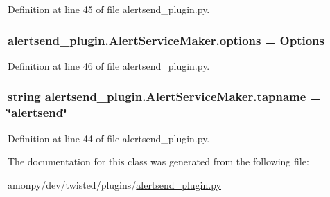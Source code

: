 Definition at line 45 of file alertsend\-\_\-plugin.\-py.

\hypertarget{classalertsend__plugin_1_1_alert_service_maker_a3ca254bf6fd586ded22ae26866a8dbb9}{
\subsubsection[{options}]{\setlength{\rightskip}{0pt plus 5cm}alertsend\-\_\-plugin.\-Alert\-Service\-Maker.\-options = {\bf Options}\hspace{0.3cm}{\ttfamily [static]}}}\label{classalertsend__plugin_1_1_alert_service_maker_a3ca254bf6fd586ded22ae26866a8dbb9}


Definition at line 46 of file alertsend\-\_\-plugin.\-py.

\hypertarget{classalertsend__plugin_1_1_alert_service_maker_abf35c4fc0c983dfca5201f25cb643a1a}{
\subsubsection[{tapname}]{\setlength{\rightskip}{0pt plus 5cm}string alertsend\-\_\-plugin.\-Alert\-Service\-Maker.\-tapname = \char`\"{}alertsend\char`\"{}\hspace{0.3cm}{\ttfamily [static]}}}\label{classalertsend__plugin_1_1_alert_service_maker_abf35c4fc0c983dfca5201f25cb643a1a}


Definition at line 44 of file alertsend\-\_\-plugin.\-py.



The documentation for this class was generated from the following file\-:\begin{DoxyCompactItemize}
\item 
amonpy/dev/twisted/plugins/\hyperlink{alertsend__plugin_8py}{alertsend\-\_\-plugin.\-py}\end{DoxyCompactItemize}
